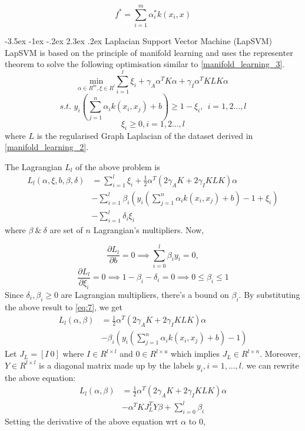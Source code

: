 \documentclass[12pt,a4paper,oneside,english]{report}
\makeatletter
\renewcommand\section{\@startsection {section}{1}{\z@}%
                                   {-3.5ex \@plus -1ex \@minus -.2ex}%
                                   {2.3ex \@plus.2ex}%
                                   {\centering\normalfont\LARGE\bfseries}}
\makeatother
\begin{document}
\begin{equation} \label{manifold_learning_4}
f^* = \sum_{i=1}^m \alpha^*_i k(x_i,x)
\end{equation}

\section{Laplacian Support Vector Machine (LapSVM)}
LapSVM \cite{melacci2011laplacian} is based on the principle of manifold learning and uses the representer theorem to solve the following optimisation similar to \eqref{manifold_learning_3}.
\[\underset {\alpha \in R^m, \xi \in R^l }{\mathrm{min}} \sum_{i=1}^l \xi_i + \gamma_A \alpha^T K \alpha + \gamma_I \alpha^T KLK \alpha  \]
\[\textit{s.t. } y_i(\sum_{j=1}^n \alpha_i k(x_i,x_j) + b) \geq 1 - \xi_i, \ \ i =1,2...,l\]
\[ \xi_i \geq 0, i = 1,2...,l \]
where \(L\) is the regularised Graph Laplacian of the dataset derived in \eqref{manifold_learning_2}. 

The Lagrangian \(L_l\) of the above problem is
\begin{equation} \label{eq:7}
\begin{split}
L_l(\alpha,\xi,b,\beta,\delta) & = \sum_{i=1}^l \xi_i + \frac{1}{2}\alpha^T(2\gamma_A K + 2\gamma_I KLK)\alpha  \\
& - \sum_{i=1}^l \beta_i(y_i(\sum_{j=1}^n \alpha_i k(x_i,x_j) + b)- 1 + \xi_i) \\
& - \sum_{i=1}^l\delta_i \xi_i
\end{split}
\end{equation}
where \(\beta \ \& \ \delta \) are set of \(n\) Lagrangian's multipliers. Now,

\[
\frac{\partial L_l}{\partial b} = 0 \implies \sum_{i=0}^l \beta_i y_i = 0,
\]
\[
\frac{\partial L_l}{\partial \xi_i} = 0 \implies 1 - \beta_i - \delta_i = 0 \implies 0\leq \beta_i \leq 1
\]
Since \(\delta_i,\beta_i \geq 0\) are Lagrangian multipliers, there's a bound on \(\beta_i \). By substituting the above result to \eqref{eq:7}, we get
\begin{equation} \label{eq:8}
\begin{split}
   L_l(\alpha,\beta) & = \frac{1}{2}\alpha^T(2\gamma_A K + 2\gamma_I KLK)\alpha  \\ 
   & - \beta_i(y_i(\sum_{j=1}^n \alpha_i k(x_i,x_j) + b)- 1)
\end{split}
\end{equation}
Let \(J_L = [I \ 0] \) where \(I \in R^{l \times l}\) and \(0 \in R^{l \times u}\) which implies \(J_L \in R^{l \times n} \). Moreover, \(Y \in R^{l \times l}\) is a diagonal matrix made up by the labels \(y_i ,i = 1,...,l\). we can rewrite the above equation:
\begin{equation} \label{eq:9}
\begin{split}
L_l(\alpha,\beta) & = \frac{1}{2}\alpha^T(2\gamma_A K + 2\gamma_I KLK)\alpha \\ & - \alpha^T K J_L^T Y \beta + \sum_{i=0}^l \beta_i
\end{split}
\end{equation}
Setting the derivative of the above equation wrt \(\alpha\) to 0,
\end{document}
